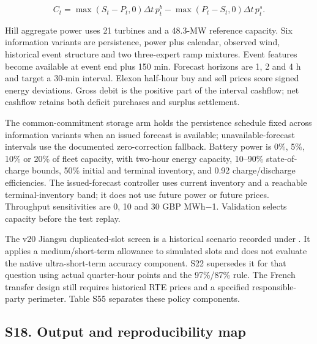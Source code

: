 \documentclass[a4paper,11pt]{article}
\begin{document}
\[
C_t=\max(S_t-P_t,0)\Delta t\,p_t^b-\max(P_t-S_t,0)\Delta t\,p_t^s.
\]

Hill aggregate power uses 21 turbines and a 48.3-MW reference capacity. Six information variants are persistence, power plus calendar, observed wind, historical event structure and two three-expert ramp mixtures. Event features become available at event end plus 150 min. Forecast horizons are 1, 2 and 4 h and target a 30-min interval. Elexon half-hour buy and sell prices score signed energy deviations. Gross debit is the positive part of the interval cashflow; net cashflow retains both deficit purchases and surplus settlement.

The common-commitment storage arm holds the persistence schedule fixed across information variants when an issued forecast is available; unavailable-forecast intervals use the documented zero-correction fallback. Battery power is 0\%, 5\%, 10\% or 20\% of fleet capacity, with two-hour energy capacity, 10--90\% state-of-charge bounds, 50\% initial and terminal inventory, and 0.92 charge/discharge efficiencies. The issued-forecast controller uses current inventory and a reachable terminal-inventory band; it does not use future power or future prices. Throughput sensitivities are 0, 10 and 30 GBP MWh−1. Validation selects capacity before the test replay.

The v20 Jiangsu duplicated-slot screen is a historical scenario recorded under . It applies a medium/short-term allowance to simulated slots and does not evaluate the native ultra-short-term accuracy component. S22 supersedes it for that question using actual quarter-hour points and the 97\%/87\% rule. The French transfer design still requires historical RTE prices and a specified responsible-party perimeter. Table S55 separates these policy components.

\subsection{S18. Output and reproducibility map}\label{s18.-output-and-reproducibility-map}
\end{document}
